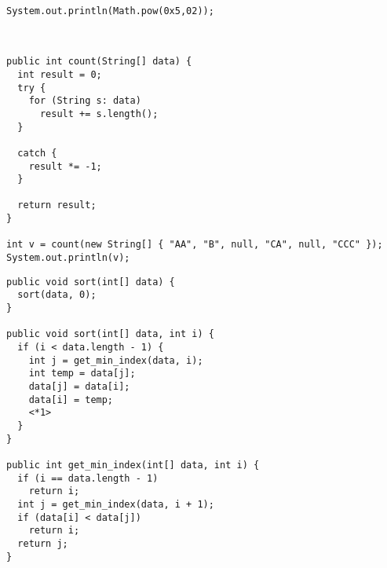 \documentclass[11pt,addpoints]{exam}
\begin{document}
\begin{questions}
\begin{minipage}{\textwidth}

\begin{verbatim}
System.out.println(Math.pow(0x5,02));
\end{verbatim}

\begin{choices}
   \\
\end{choices}
\end{minipage}

\begin{minipage}{\textwidth}

\begin{verbatim}
public int count(String[] data) {
  int result = 0;
  try {
    for (String s: data)
      result += s.length();
  }

  catch {
    result *= -1;
  }

  return result;
}

int v = count(new String[] { "AA", "B", null, "CA", null, "CCC" });
System.out.println(v);

\end{verbatim}

\begin{choices}
\end{choices}
\end{minipage}

\begin{minipage}{\textwidth}


\begin{verbatim}
public void sort(int[] data) {
  sort(data, 0);
}

public void sort(int[] data, int i) {
  if (i < data.length - 1) {
    int j = get_min_index(data, i);
    int temp = data[j];
    data[j] = data[i];
    data[i] = temp;
    <*1>
  }
}

public int get_min_index(int[] data, int i) {
  if (i == data.length - 1)
    return i;
  int j = get_min_index(data, i + 1);
  if (data[i] < data[j])
    return i;
  return j;
}
\end{verbatim}


\end{minipage}
\end{questions}
\end{document}
